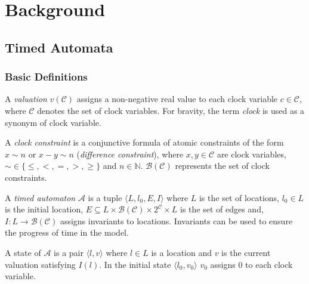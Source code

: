 \chapter{Background}
\label{chap:background}





\section{Timed Automata}
\subsection{Basic Definitions}
A \emph{valuation} $v(\mathcal{C})$ assigns a non-negative real value
to each clock variable $c \in \mathcal{C}$, where $\mathcal{C}$ denotes the set of clock
variables. For bravity, the term \emph{clock} is used as a synonym of {clock variable}.

A \emph{clock constraint} is a conjunctive formula of atomic
constraints of the form $x \sim n$ or $x - y \sim n$ (\emph{difference
	constraint}), where $x,y \in \mathcal{C}$ are clock variables, $\sim \in
\{\leq,<,=,>,\geq\}$ and \hbox{$n \in \mathbb{N}$}. $\mathcal{B}(\mathcal{C})$ represents the set of clock
constraints.

A \emph{timed automaton} $\mathcal{A}$ is a tuple $\langle L, l_0,
E, I\rangle$ where
$L$ is the set of locations,
$l_0 \in L$ is the initial location,
$E \subseteq L \times \mathcal{B}(\mathcal{C}) \times 2^\mathcal{C} \times L$
is the set of edges and,
$I: L \to \mathcal{B}(\mathcal{C})$ assigns invariants to locations.  Invariants can be used to ensure the progress of time in the model.


A state of $\mathcal{A}$ is a pair $\langle l,v \rangle$ where $l \in L$ is a
location and $v$ is the current valuation satisfying $I(l)$. In the initial
state $\langle l_0,v_0 \rangle$ $v_0$ assigns 0 to each clock variable.

